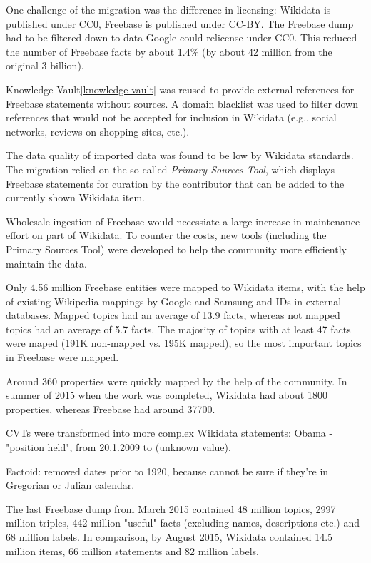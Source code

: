 One challenge of the migration was the difference in licensing: Wikidata is
published under CC0, Freebase is published under CC-BY. The Freebase dump had to
be filtered down to data Google could relicense under CC0. This reduced the
number of Freebase facts by about 1.4\% (by about 42 million from the original
3 billion).

Knowledge Vault\ref{knowledge-vault} was reused to provide external references
for Freebase statements without sources. A domain blacklist was used to filter
down references that would not be accepted for inclusion in Wikidata (e.g.,
social networks, reviews on shopping sites, etc.).

The data quality of imported data was found to be low by Wikidata standards.
The migration relied on the so-called \textit{Primary Sources Tool}, which
displays Freebase statements for curation by the contributor that can be added
to the currently shown Wikidata item.

Wholesale ingestion of Freebase would necessiate a large increase in
maintenance effort on part of Wikidata. To counter the costs, new tools
(including the Primary Sources Tool) were developed to help the community
more efficiently maintain the data.

Only 4.56 million Freebase entities were mapped to Wikidata items, with the help
of existing Wikipedia mappings by Google and Samsung and IDs in external
databases.
Mapped topics had an average of 13.9 facts, whereas not mapped topics had an
average of 5.7 facts. The majority of topics with at least 47 facts were maped
(191K non-mapped vs. 195K mapped), so the most important topics in Freebase were
mapped.

Around 360 properties were quickly mapped by the help of the community. In
summer of 2015 when the work was completed, Wikidata had about 1800 properties,
whereas Freebase had around 37700.

CVTs were transformed into more complex Wikidata statements:
Obama - "position held", from 20.1.2009 to (unknown value).

Factoid: removed dates prior to 1920, because cannot be sure if they're in
Gregorian or Julian calendar.

The last Freebase dump from March 2015 contained 48 million topics, 2997 million
triples, 442 million "useful" facts (excluding names, descriptions etc.) and 68
million labels.
In comparison, by August 2015, Wikidata contained 14.5 million items, 66 million
statements and 82 million labels.

